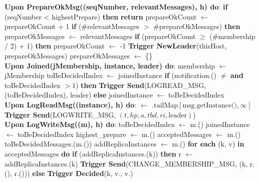\documentclass[sigconf]{acmart}
\begin{document}
\begin{algorithmic}[1]
\State \textbf{Upon PrepareOkMsg((seqNumber, relevantMessages), h) do}:
\State \quad \textbf{if} (seqNumber < highestPrepare) \textbf{then}
\State \quad \quad \textbf{return}
\State \quad prepareOkCount $\gets$ prepareOkCount + 1
\State \quad \textbf{if} (\#relevantMessages $> $ \#prepareOkMessages) \textbf{then}
\State \quad \quad prepareOkMessages $\gets$ relevantMessages
\State \quad \textbf{if} (prepareOkCount $\ge$ (\#membership / 2) + 1) \textbf{then}
\State \quad \quad prepareOkCount $\gets$ -1
\State \quad \quad \textbf{Trigger NewLeader}(thisHost, prepareOkMessages)
\State \quad \quad prepareOkMessages $\gets$ \{\} \\

\State \textbf{Upon Joined(jMembership, instance, leader) do}:
\State \quad membership $\gets$ jMembership
\State \quad toBeDecidedIndex $\gets$ joinedInstance 
\State \quad \textbf{if} (notification.() $\neq$  \textbf{and} toBeDecidedIndex $> 1$) \textbf{then}
\State \quad \quad\textbf{Trigger Send}(LOGREAD\_MSG, (toBeDecidedIndex), leader)
\State \quad \textbf{else}
\State \quad \quad joinedInstance $\gets$ toBeDecidedIndex \\

\State \textbf{Upon LogReadMsg((instance), h) do}:
\State \quad {} $\gets$ \( \text{.tailMap} [\text{msg.getInstance()}, \infty] \)
\State \quad \textbf{Trigger Send}(LOGWRITE\_MSG, $(t, hp, a, tbd, ri, \text{leader})$) \\

\State \textbf{Upon LogWriteMsg((m), h) do}:
\State \quad toBeDecidedIndex $\gets$ m.()
\State \quad joinedInstance $\gets$ toBeDecidedIndex
\State \quad highest\_prepare $\gets$ m.()
\State \quad acceptedMessages $\gets$ m.()
\State \quad toBeDecidedMessages.(m.())
\State \quad addReplicaInstances $\gets$ m.()
\State \quad \textbf{for each} (k, v) \textbf{in} acceptedMessages \textbf{do}
\State \quad \quad \textbf{if} (addReplicaInstances.(k)) \textbf{then}
\State \quad \quad \quad r $\gets$ addReplicaInstances.(k)
\State \quad \quad \quad \textbf{Trigger Send}(CHANGE\_MEMBERSHIP\_MSG, (k, r.(), r.()))
\State \quad \quad \textbf{else}
\State \quad \quad \quad \textbf{Trigger Decided}(k, v., v.) \\


\end{algorithmic}
\end{document}
